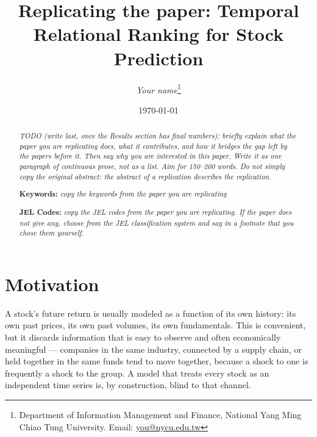 \documentclass[12pt]{article}
\newcommand{\inst}[1]{\textit{#1}}
\begin{document}
\begin{titlepage}

\title{Replicating the paper:
       Temporal Relational Ranking for Stock Prediction \citep{feng2019temporal}}

\author{\inst{Your name}\thanks{Department of Information Management and Finance,
        National Yang Ming Chiao Tung University. Email:
        \href{mailto:you@nycu.edu.tw}{you@nycu.edu.tw}}}

\date{\today}
\maketitle

\begin{abstract}
\noindent
\inst{TODO (write last, once the Results section has final numbers): briefly explain what
the paper you are replicating does, what it contributes, and how it bridges the gap left by
the papers before it. Then say why you are interested in this paper. Write it as one
paragraph of continuous prose, not as a list. Aim for 150--200 words. Do not simply copy
the original abstract: the abstract of a replication describes the replication.}

\vspace{0in}
\noindent\textbf{Keywords:} \inst{copy the keywords from the paper you are replicating}

\vspace{0in}
\noindent\textbf{JEL Codes:} \inst{copy the JEL codes from the paper you are
replicating. If the paper does not give any, choose from the JEL classification
system and say in a footnote that you chose them yourself.}

\bigskip
\end{abstract}

\setcounter{page}{0}
\thispagestyle{empty}
\end{titlepage}
\pagebreak

\newpage
\clearpage


\section{Motivation}
\label{sec:motivation}

A stock's future return is usually modeled as a function of its own history: its own past
prices, its own past volumes, its own fundamentals. This is convenient, but it discards
information that is easy to observe and often economically meaningful --- companies in the same
industry, connected by a supply chain, or held together in the same funds tend to move together,
because a shock to one is frequently a shock to the group. A model that treats every stock as an
independent time series is, by construction, blind to that channel.
\end{document}
